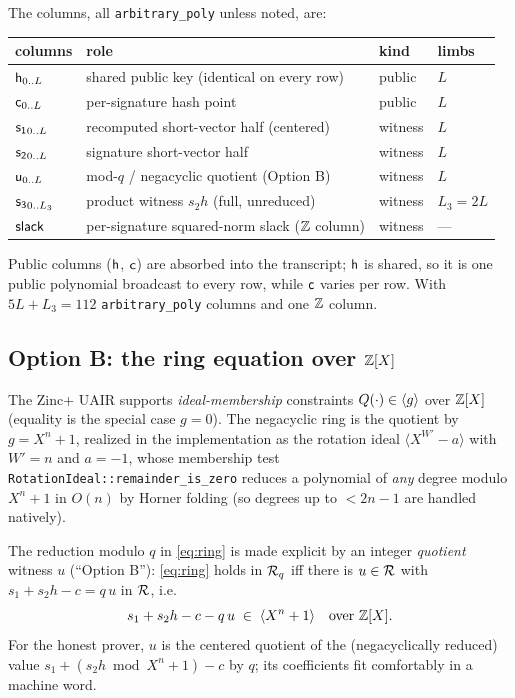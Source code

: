 \smallskip
\noindent The columns, all \texttt{arbitrary\_poly} unless noted, are:
\begin{center}
\begin{tabular}{@{}llll@{}}
\toprule
columns & role & kind & limbs \\
\midrule
$\mathsf{h}_{0..L}$       & shared public key (identical on every row) & public  & $L$ \\
$\mathsf{c}_{0..L}$       & per-signature hash point                   & public  & $L$ \\
$\mathsf{s_1}_{0..L}$     & recomputed short-vector half (centered)    & witness & $L$ \\
$\mathsf{s_2}_{0..L}$     & signature short-vector half                & witness & $L$ \\
$\mathsf{u}_{0..L}$       & mod-$q$ / negacyclic quotient (Option B)   & witness & $L$ \\
$\mathsf{s_3}_{0..L_3}$   & product witness $s_2 h$ (full, unreduced)  & witness & $L_3 = 2L$ \\
$\mathsf{slack}$          & per-signature squared-norm slack ($\mathbb{Z}$ column) & witness & --- \\
\bottomrule
\end{tabular}
\end{center}
Public columns ($\mathsf{h}$, $\mathsf{c}$) are absorbed into the transcript;
$\mathsf{h}$ is shared, so it is one public polynomial broadcast to every
row, while $\mathsf{c}$ varies per row. With $5L + L_3 = 112$
\texttt{arbitrary\_poly} columns and one $\mathbb{Z}$ column.

\subsection{Option B: the ring equation over \texorpdfstring{$\mathbb{Z}[X]$}{Z[X]}}\label{sec:optionb}

The Zinc+ UAIR supports \emph{ideal-membership} constraints
$Q(\cdot)\in\langle g \rangle$ over $\mathbb{Z}[X]$ (equality is the special case
$g=0$). The negacyclic ring is the quotient by
$g = X^n+1$, realized in the implementation as the rotation ideal
$\langle X^{W'} - a\rangle$ with $W' = n$ and $a = -1$, whose membership
test \texttt{RotationIdeal::remainder\_is\_zero} reduces a polynomial of
\emph{any} degree modulo $X^n+1$ in $O(n)$ by Horner folding (so degrees
up to $<2n-1$ are handled natively).

The reduction modulo $q$ in \cref{eq:ring} is made explicit by an integer
\emph{quotient} witness $u$ (``Option B''): \cref{eq:ring} holds in $\mathcal{R}_q$
iff there is $u\in\mathcal{R}$ with
$s_1 + s_2 h - c = q\,u$ in $\mathcal{R}$, i.e.
\begin{equation}\label{eq:ring-z}
  s_1 + s_2 h - c - q\,u \;\in\; \langle X^{n}+1\rangle \quad\text{over } \mathbb{Z}[X].
\end{equation}
For the honest prover, $u$ is the centered quotient of the (negacyclically
reduced) value $s_1 + (s_2 h \bmod X^n{+}1) - c$ by $q$; its coefficients
fit comfortably in a machine word.

